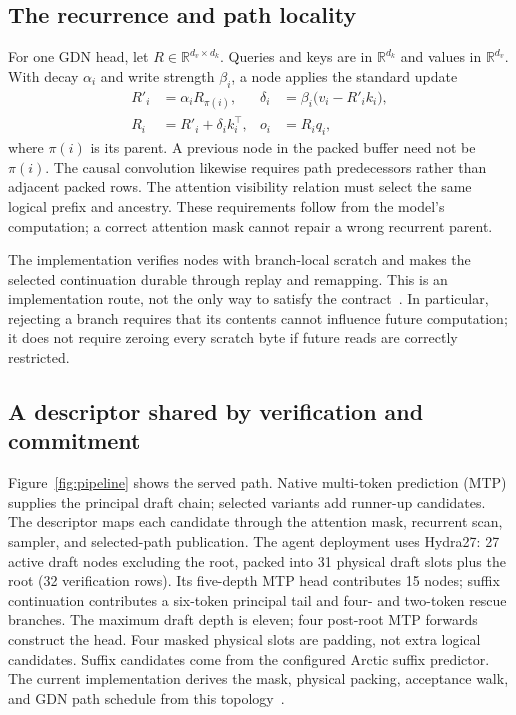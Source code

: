 \documentclass[conference]{IEEEtran}
\begin{document}
\subsection{The recurrence and path locality}
For one GDN head, let $R\in\mathbb{R}^{d_v\times d_k}$. Queries and keys are in $\mathbb{R}^{d_k}$ and values in $\mathbb{R}^{d_v}$. With decay $\alpha_i$ and write strength $\beta_i$, a node applies the standard update~\cite{yang2024gated}
\begin{align}
R'_i &= \alpha_i R_{\pi(i)}, &
\delta_i &= \beta_i\bigl(v_i-R'_i k_i\bigr),\\
R_i &= R'_i+\delta_i k_i^\top, &
o_i &= R_iq_i,
\end{align}
where $\pi(i)$ is its parent. A previous node in the packed buffer need not be $\pi(i)$. The causal convolution likewise requires path predecessors rather than adjacent packed rows. The attention visibility relation must select the same logical prefix and ancestry. These requirements follow from the model's computation; a correct attention mask cannot repair a wrong recurrent parent.

The implementation verifies nodes with branch-local scratch and makes the selected continuation durable through replay and remapping. This is an implementation route, not the only way to satisfy the contract~\cite{lumo2026archive,lumo2026stateless}. In particular, rejecting a branch requires that its contents cannot influence future computation; it does not require zeroing every scratch byte if future reads are correctly restricted.

\subsection{A descriptor shared by verification and commitment}
Figure~\ref{fig:pipeline} shows the served path. Native multi-token prediction (MTP) supplies the principal draft chain; selected variants add runner-up candidates. The descriptor maps each candidate through the attention mask, recurrent scan, sampler, and selected-path publication. The agent deployment uses Hydra27: 27 active draft nodes excluding the root, packed into 31 physical draft slots plus the root (32 verification rows). Its five-depth MTP head contributes 15 nodes; suffix continuation contributes a six-token principal tail and four- and two-token rescue branches. The maximum draft depth is eleven; four post-root MTP forwards construct the head. Four masked physical slots are padding, not extra logical candidates. Suffix candidates come from the configured Arctic suffix predictor. The current implementation derives the mask, physical packing, acceptance walk, and GDN path schedule from this topology~\cite{lumo2026archive}.
\end{document}
